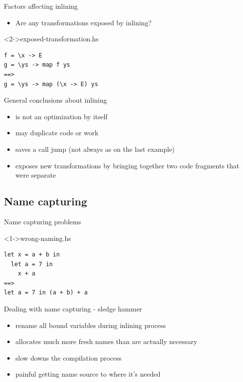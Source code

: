 \documentclass[hyperref={pdfpagelabels=false},xcolor={dvipsnames},compress,table,usenames,dvipsnames]{beamer}
\begin{document}
    \begin{frame}[fragile]{Factors affecting inlining}
        \begin{itemize}
            \item Are any transformations exposed by inlining?
        \end{itemize}
        \begin{exampleblock}
            <2->{exposed-transformation.hs}
            \begin{lstlisting}
f = \x -> E
g = \ys -> map f ys
==>
g = \ys -> map (\x -> E) ys
            \end{lstlisting}
        \end{exampleblock}
    \end{frame}

    \begin{frame}[fragile]{General conclusions about inlining}
        \begin{itemize}
            \item is not an optimization by itself\pause
            \item may duplicate code or work\pause
            \item saves a call jump (not always as on the last example)\pause
            \item exposes new transformations by bringing together two code fragments that were separate
        \end{itemize}
    \end{frame}

    \subsection{Name capturing}

    \begin{frame}[fragile]{Name capturing problems}
        \begin{exampleblock}
            <1->{wrong-naming.hs}
            \begin{lstlisting}
let x = a + b in
  let a = 7 in
    x + a
==>
let a = 7 in (a + b) + a
            \end{lstlisting}
        \end{exampleblock}
    \end{frame}

    \begin{frame}[fragile]{Dealing with name capturing - sledge hammer}
        \begin{itemize}
            \item rename all bound variables during inlining process\pause
            \item allocates much more fresh names than are actually necessary\pause
            \item slow downs the compilation process\pause
            \item painful getting name source to where it's needed
        \end{itemize}
    \end{frame}
\end{document}
